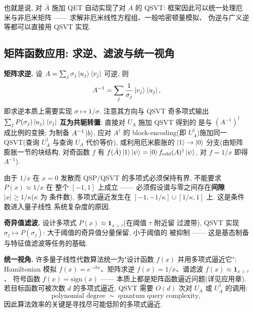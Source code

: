 \documentclass[utf8]{article} %
\numberwithin{equation}{section}   %
\newtheorem{Note}{\hskip 2em {\color{red} 注}}[subsection]
\begin{document}
\begin{Note}
    也就是说, 对 $\bar{A}$ 施加 QET 自动实现了对 $A$ 的 QSVT:
    框架因此可以统一处理厄米与非厄米矩阵 —— 求解非厄米线性方程组、一般哈密顿量模拟、
    伪逆与广义逆等都可以直接用 QSVT 实现.
\end{Note}

\subsection{矩阵函数应用: 求逆、滤波与统一视角}

\textbf{矩阵求逆.} 设 $A = \sum_j \sigma_j\ket{u_j}\bra{v_j}$ 可逆, 则
\begin{equation}
    A^{-1} = \sum_j \frac{1}{\sigma_j}\ket{v_j}\bra{u_j},
\end{equation}
即求逆本质上需要实现 $\sigma \mapsto 1/\sigma$. 注意其方向与 QSVT 奇多项式输出
$\sum_j P(\sigma_j)\ket{u_j}\bra{v_j}$ \textbf{互为共轭转置}: 直接对 $U_A$ 施加 QSVT 得到的
是与 $(A^{-1})^\dagger$ 成比例的变换; 为制备 $A^{-1}\ket{b}$, 应对 $A^\dagger$ 的 block-encoding(即
$U_A^\dagger$)施加同一 QSVT(查询 $U_A^\dagger$ 与查询 $U_A$ 代价等价), 或利用厄米膨胀的
$\ket{1} \to \ket{0}$ 分支(由矩阵膨胀一节的块结构, 对奇函数 $f$ 有
$f(\bar A)\ket{1}\ket{\psi} = \ket{0} f_{\mathrm{odd}}(A)^\dagger \ket{\psi}$, 对
$f = 1/x$ 即得 $A^{-1}$).

由于 $1/x$ 在 $x = 0$ 发散而 QSP/QSVT 的多项式必须保持有界, 不能要求 $P(x) \approx 1/x$ 在
整个 $[-1,1]$ 上成立 —— 必须假设谱与零之间存在\textbf{间隙} $|x| \ge 1/\kappa$($\kappa$ 为
条件数), 多项式逼近发生在 $[-1,-1/\kappa] \cup [1/\kappa, 1]$ 上. 这是条件数进入量子线性
系统复杂度的原因.

\textbf{奇异值滤波.} 设计多项式 $P(x) \approx \mathbf 1_{x > \tau}$(在阈值 $\tau$ 附近留
过渡带), QSVT 实现 $\sigma_j \mapsto P(\sigma_j)$: 大于阈值的奇异值分量保留, 小于阈值的
被抑制 —— 这是基态制备与特征值滤波等任务的基础.

\textbf{统一视角.} 许多量子线性代数算法统一为"设计函数 $f(x)$ 并用多项式逼近它":
Hamiltonian 模拟 $f(x) = e^{-itx}$、矩阵求逆 $f(x) = 1/x$、谱滤波 $f(x) \approx \mathbf 1_{x>\tau}$、
符号函数 $f(x) = \mathrm{sign}(x)$ —— 本质上都是矩阵函数逼近问题(详见应用章).
若目标函数可被次数 $d$ 的多项式逼近, QSVT 需要 $O(d)$ 次对 $U_A$ 或 $U_A^\dagger$ 的调用:
\begin{equation}
    \text{polynomial degree} \;\sim\; \text{quantum query complexity},
\end{equation}
因此算法效率的关键是寻找尽可能低阶的多项式逼近.
\end{document}
